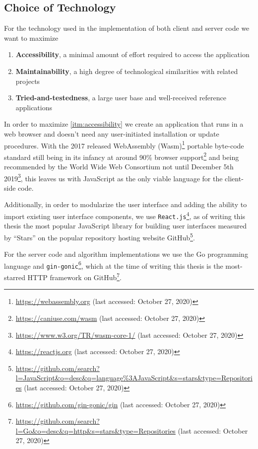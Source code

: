 \subsection{Choice of Technology}

For the technology used in the implementation of both client and server code we want to maximize

\begin{enumerate}[label={(\roman*)}]
    \item \label{itm:accessibility} \textbf{Accessibility}, a minimal amount of effort required to access the application
    \item \label{itm:maintainability} \textbf{Maintainability}, a high degree of technological similarities with related projects 
    \item \label{itm:testedness} \textbf{Tried-and-testedness}, a large user base and well-received reference applications
\end{enumerate}

In order to maximize \ref{itm:accessibility} we create an application that runs in a web browser and doesn't need any user-initiated installation or update procedures.
With the 2017 released WebAssembly (Wasm)\footnote{\url{https://webassembly.org} (last accessed: October 27, 2020)} portable byte-code standard still being in its infancy at around 90\% browser support\footnote{\url{https://caniuse.com/wasm} (last accessed: October 27, 2020)} and being recommended by the World Wide Web Consortium not until December 5th 2019\footnote{\url{https://www.w3.org/TR/wasm-core-1/} (last accessed: October 27, 2020)}, this leaves us with JavaScript as the only viable language for the client-side code. 

Additionally, in order to modularize the user interface and adding the ability to import existing user interface components, we use \texttt{React.js}\footnote{\url{https://reactjs.org} (last accessed: October 27, 2020)}, as of writing this thesis the most popular JavaScript library for building user interfaces measured by ``Stars'' on the popular repository hosting website GitHub\footnote{\url{https://github.com/search?l=JavaScript&o=desc&q=language\%3AJavaScript&s=stars&type=Repositories} (last accessed: October 27, 2020)}.

For the server code and algorithm implementations we use the Go programming language and \texttt{gin-gonic}\footnote{\url{https://github.com/gin-gonic/gin} (last accessed: October 27, 2020)}, which at the time of writing this thesis is the most-starred HTTP framework on GitHub\footnote{\url{https://github.com/search?l=Go&o=desc&q=http&s=stars&type=Repositories} (last accessed: October 27, 2020)}.

